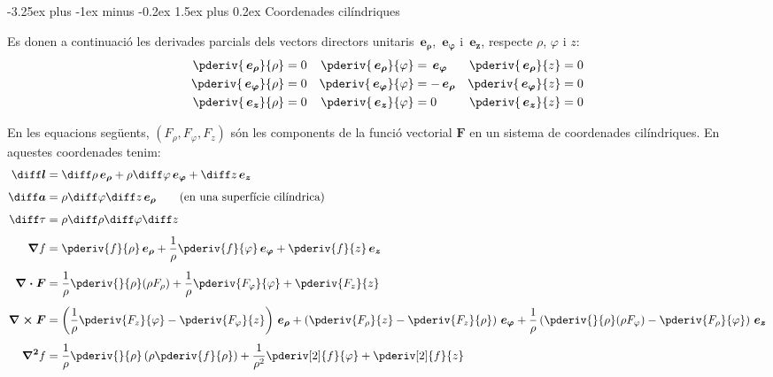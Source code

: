 \documentclass[catalan,a4paper,twoside,11pt]{article}
\makeatletter
\renewcommand{\subsection}{\@startsection {subsection}{2}{0pt}%
	{-3.25ex plus -1ex minus -0.2ex}%
	{1.5ex plus 0.2ex}%
	{\large  \sffamily  \bfseries}}
\makeatother
\begin{document}
\subsection{Coordenades cilíndriques}

\renewcommand{\va}{\ensuremath{\,\boldsymbol{e_\rho}}}
\renewcommand{\vb}{\ensuremath{\,\boldsymbol{e_\varphi}}}
\renewcommand{\vc}{\ensuremath{\,\boldsymbol{e_z}}}

Es donen a continuació les derivades parcials dels vectors directors unitaris $\va$, $\vb$ i $\vc$, respecte $\rho$, $\varphi$ i $z$:
\begin{subequations}
\begin{align}
   \pderiv{\va}{\rho} &= 0 & \pderiv{\va}{\varphi} &= \vb  & \pderiv{\va}{z} &= 0 \\
   \pderiv{\vb}{\rho} &= 0 & \pderiv{\vb}{\varphi} &= -\va & \pderiv{\vb}{z} &= 0 \\
   \pderiv{\vc}{\rho} &= 0 & \pderiv{\vc}{\varphi} &= 0    & \pderiv{\vc}{z} &= 0
\end{align}
\end{subequations}

En les equacions següents, $(F_\rho,F_\varphi,F_z)$  són les
components de la funció vectorial   $\boldsymbol{F}$ en un sistema de
coordenades cilíndriques. En aquestes coordenades tenim:
\begin{align}
    \boldsymbol{\diff l} &= \diff \rho \va + \rho\diff \varphi \vb + \diff z \vc\\[1ex]
    \boldsymbol{\diff a} &= \rho\diff \varphi \diff z \va\qquad\text{(en una superfície cilíndrica)}\\[1ex]
    \diff\tau &= \rho \diff \rho \diff \varphi \diff z\\[1ex]
    \boldsymbol{\nabla}f &= \pderiv{f}{\rho}\va + \frac{1}{\rho}\pderiv{f}{\varphi}\vb
    + \pderiv{f}{z}\vc\\[1ex]
    \boldsymbol{\nabla\cdot F} &= \frac{1}{\rho}\pderiv{}{\rho}(\rho F_\rho) +
    \frac{1}{\rho}\pderiv{F_\varphi}{\varphi}+ \pderiv{F_z}{z}\\[1ex]
    \boldsymbol{\nabla\times F} &= \left(\frac{1}{\rho}\pderiv{F_z}{\varphi}-
    \pderiv{F_\varphi}{z}\right)\va +
    \left(\pderiv{F_\rho}{z}-\pderiv{F_z}{\rho}\right)\vb +
    \frac{1}{\rho}\left(\pderiv{}{\rho}(\rho F_\varphi)-\pderiv{F_\rho}{\varphi}\right)\vc\\[1ex]
    \boldsymbol{\nabla^2}f &= \frac{1}{\rho}\pderiv{}{\rho}\left(\rho\pderiv{f}{\rho}
    \right)
    + \frac{1}{\rho^2}\pderiv[2]{f}{\varphi}+ \pderiv[2]{f}{z}
\end{align}
\end{document}
